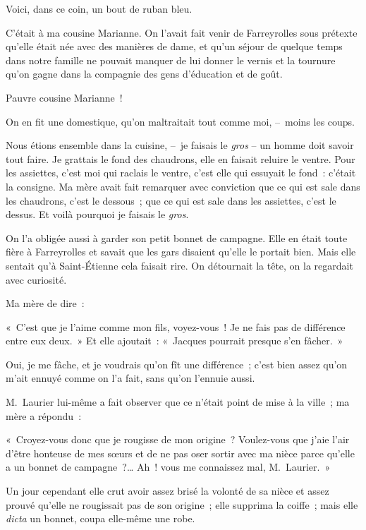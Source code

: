 \documentclass[french,twoside]{book} %
\begin{document}
\bigbreak
\noindent Voici, dans ce coin, un bout de ruban bleu.\par
C’était à ma cousine Marianne. On l’avait fait venir de Farreyrolles sous prétexte qu’elle était née avec des manières de dame, et qu’un séjour de quelque temps dans notre famille ne pouvait manquer de lui donner le vernis et la tournure qu’on gagne dans la compagnie des gens d’éducation et de goût.\par
\bigbreak
\noindent Pauvre cousine Marianne !\par
On en fit une domestique, qu’on maltraitait tout comme moi, – moins les coups.\par
Nous étions ensemble dans la cuisine, – je faisais le \emph{gros} – un homme doit savoir tout faire. Je grattais le fond des chaudrons, elle en faisait reluire le ventre. Pour les assiettes, c’est moi qui raclais le ventre, c’est elle qui essuyait le fond : c’était la consigne. Ma mère avait fait remarquer avec conviction que ce qui est sale dans les chaudrons, c’est le dessous ; que ce qui est sale dans les assiettes, c’est le dessus. Et voilà pourquoi je faisais le\emph{ gros}.\par
On l’a obligée aussi à garder son petit bonnet de campagne. Elle en était toute fière à Farreyrolles et savait que les gars disaient qu’elle le portait bien. Mais elle sentait qu’à Saint-Étienne cela faisait rire. On détournait la tête, on la regardait avec curiosité.\par
Ma mère de dire :\par
« C’est que je l’aime comme mon fils, voyez-vous ! Je ne fais pas de différence entre eux deux. » Et elle ajoutait : « Jacques pourrait presque s’en fâcher. »\par
Oui, je me fâche, et je voudrais qu’on fît une différence ; c’est bien assez qu’on m’ait ennuyé comme on l’a fait, sans qu’on l’ennuie aussi.\par
M. Laurier lui-même a fait observer que ce n’était point de mise à la ville ; ma mère a répondu :\par
« Croyez-vous donc que je rougisse de mon origine ? Voulez-vous que j’aie l’air d’être honteuse de mes sœurs et de ne pas oser sortir avec ma nièce parce qu’elle a un bonnet de campagne ?… Ah ! vous me connaissez mal, M. Laurier. »\par
\bigbreak
\noindent Un jour cependant elle crut avoir assez brisé la volonté de sa nièce et assez prouvé qu’elle ne rougissait pas de son origine ; elle supprima la coiffe ; mais elle \emph{dicta} un bonnet, coupa elle-même une robe.\par
\end{document}
